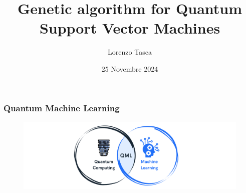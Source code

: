 \documentclass{beamer}
\title[Genetic algorithm for QSVM] 
{Genetic algorithm for Quantum Support Vector Machines}
\author[Lorenzo Tasca]
{Lorenzo Tasca}
\date[25/11/2024] 
{25 Novembre 2024}
\begin{document}
\frame{\titlepage}

\begin{frame}
\frametitle{Quantum Machine Learning}


\centering
\begin{figure}
      \includegraphics[width=1.1\textwidth]{images/1.png}
     \end{figure}

  

   
\end{frame}
\end{document}
